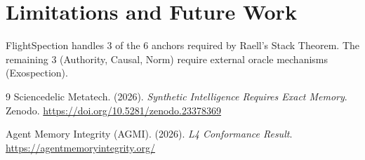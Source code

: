 \documentclass[11pt, a4paper]{article}
\begin{document}
\section{Limitations and Future Work}
FlightSpection handles 3 of the 6 anchors required by Raell's Stack Theorem. The remaining 3 (Authority, Causal, Norm) require external oracle mechanisms (Exospection).

\begin{thebibliography}{9}
Sciencedelic Metatech. (2026). \textit{Synthetic Intelligence Requires Exact Memory}. Zenodo. 
\url{https://doi.org/10.5281/zenodo.23378369}

Agent Memory Integrity (AGMI). (2026). \textit{L4 Conformance Result}. 
\url{https://agentmemoryintegrity.org/}
\end{thebibliography}
\end{document}
